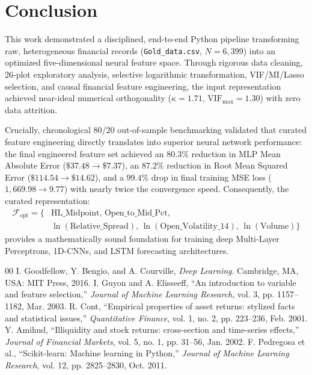 \documentclass[conference]{IEEEtran}
\begin{document}
\section{Conclusion}
\label{sec:conclusion}

This work demonstrated a disciplined, end-to-end Python pipeline transforming raw, heterogeneous financial records (\texttt{Gold\_data.csv}, $N = 6{,}399$) into an optimized five-dimensional neural feature space. Through rigorous data cleaning, 26-plot exploratory analysis, selective logarithmic transformation, VIF/MI/Lasso selection, and causal financial feature engineering, the input representation achieved near-ideal numerical orthogonality ($\kappa = 1.71$, $\text{VIF}_{\max} = 1.30$) with zero data attrition.

Crucially, chronological 80/20 out-of-sample benchmarking validated that curated feature engineering directly translates into superior neural network performance: the final engineered feature set achieved an $80.3\%$ reduction in MLP Mean Absolute Error ($\$37.48 \to \$7.37$), an $87.2\%$ reduction in Root Mean Squared Error ($\$114.54 \to \$14.62$), and a $99.4\%$ drop in final training MSE loss ($1{,}669.98 \to 9.77$) with nearly twice the convergence speed. Consequently, the curated representation:
\begin{equation}
\begin{split}
    \mathcal{F}_{\text{opt}} = \big\{ & \text{HL\_Midpoint},\, \text{Open\_to\_Mid\_Pct}, \\
    & \ln(\text{Relative\_Spread}),\, \ln(\text{Open\_Volatility\_14}),\, \ln(\text{Volume}) \big\}
\end{split}
\end{equation}
provides a mathematically sound foundation for training deep Multi-Layer Perceptrons, 1D-CNNs, and LSTM forecasting architectures.

\begin{thebibliography}{00}
 I. Goodfellow, Y. Bengio, and A. Courville, \textit{Deep Learning}. Cambridge, MA, USA: MIT Press, 2016.
 I. Guyon and A. Elisseeff, ``An introduction to variable and feature selection,'' \textit{Journal of Machine Learning Research}, vol. 3, pp. 1157--1182, Mar. 2003.
 R. Cont, ``Empirical properties of asset returns: stylized facts and statistical issues,'' \textit{Quantitative Finance}, vol. 1, no. 2, pp. 223--236, Feb. 2001.
 Y. Amihud, ``Illiquidity and stock returns: cross-section and time-series effects,'' \textit{Journal of Financial Markets}, vol. 5, no. 1, pp. 31--56, Jan. 2002.
 F. Pedregosa et al., ``Scikit-learn: Machine learning in Python,'' \textit{Journal of Machine Learning Research}, vol. 12, pp. 2825--2830, Oct. 2011.
\end{thebibliography}
\end{document}
